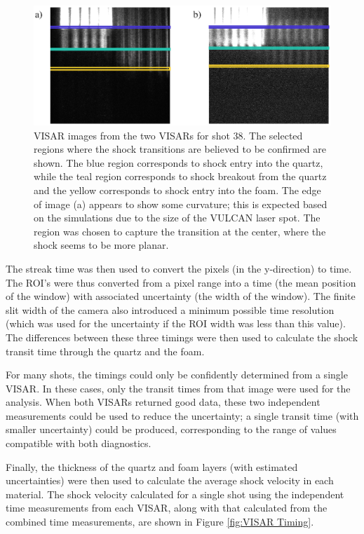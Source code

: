 \begin{figure} [h]
\begin{centering}
\includegraphics[width=1.0\textwidth]{figures/Experiment/VISARROI.eps}%
\caption{\label{fig:VISAR ROI} VISAR images from the two VISARs for shot 38. The selected regions where the shock transitions are believed to be confirmed are shown. The blue region corresponds to shock entry into the quartz, while the teal region corresponds to shock breakout from the quartz and the yellow corresponds to shock entry into the foam. The edge of image (a) appears to show some curvature; this is expected based on the simulations due to the size of the VULCAN laser spot. The region was chosen to capture the transition at the center, where the shock seems to be more planar.}
\end{centering}
\end{figure}

The streak time was then used to convert the pixels (in the y-direction) to time. The ROI's were thus converted from a pixel range into a time (the mean position of the window) with associated uncertainty (the width of the window). The finite slit width of the camera also introduced a minimum possible time resolution (which was used for the uncertainty if the ROI width was less than this value). The differences between these three timings were then used to calculate the shock transit time through the quartz and the foam.

For many shots, the timings could only be confidently determined from a single VISAR. In these cases, only the transit times from that image were used for the analysis. When both VISARs returned good data, these two independent measurements could be used to reduce the uncertainty; a single transit time (with smaller uncertainty) could be produced, corresponding to the range of values compatible with both diagnostics. 

Finally, the thickness of the quartz and foam layers (with estimated uncertainties) were then used to calculate the average shock velocity in each material. The shock velocity calculated for a single shot using the independent time measurements from each VISAR, along with that calculated from the combined time measurements, are shown in Figure \ref{fig:VISAR Timing}.

